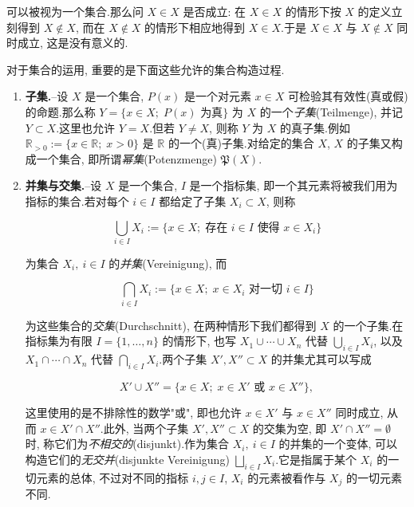 可以被视为一个集合.那么问 $X \in X$ 是否成立: 在 $X \in X$ 的情形下按 $X$ 的定义立刻得到 $X \notin X$, 而在 $X \notin X$ 的情形下相应地得到 $X \in X$.于是 $X \in X$ 与 $X \notin X$ 同时成立, 这是没有意义的.

对于集合的运用, 重要的是下面这些允许的集合构造过程.

\begin{enumerate}
\item[(1)] \textbf{子集.}--设 $X$ 是一个集合, $P(x)$ 是一个对元素 $x \in X$ 可检验其有效性(真或假)的命题.那么称 $Y = \{x \in X;\; P(x) \text{ 为真}\}$ 为 $X$ 的一个\emph{子集}(\textup{Teilmenge}), 并记 $Y \subset X$.这里也允许 $Y = X$.但若 $Y \neq X$, 则称 $Y$ 为 $X$ 的真子集.例如 $\mathbb{R}_{>0} := \{x \in \mathbb{R};\; x > 0\}$ 是 $\mathbb{R}$ 的一个(真)子集.对给定的集合 $X$, $X$ 的子集又构成一个集合, 即所谓\emph{幂集}(\textup{Potenzmenge}) $\mathfrak{P}(X)$.

\item[(2)] \textbf{并集与交集.}--设 $X$ 是一个集合, $I$ 是一个指标集, 即一个其元素将被我们用为指标的集合.若对每个 $i \in I$ 都给定了子集 $X_i \subset X$, 则称

\[
\bigcup_{i \in I} X_i := \{x \in X;\; \text{存在 } i \in I \text{ 使得 } x \in X_i\}
\]

为集合 $X_i,\ i \in I$ 的\emph{并集}(\textup{Vereinigung}), 而

\[
\bigcap_{i \in I} X_i := \{x \in X;\; x \in X_i \text{ 对一切 } i \in I\}
\]

为这些集合的\emph{交集}(\textup{Durchschnitt}), 在两种情形下我们都得到 $X$ 的一个子集.在指标集为有限 $I = \{1, \ldots, n\}$ 的情形下, 也写 $X_1 \cup \cdots \cup X_n$ 代替 $\bigcup_{i \in I} X_i$, 以及 $X_1 \cap \cdots \cap X_n$ 代替 $\bigcap_{i \in I} X_i$.两个子集 $X', X'' \subset X$ 的并集尤其可以写成

\[
X' \cup X'' = \{x \in X;\; x \in X' \text{ 或 } x \in X''\},
\]

这里使用的是不排除性的数学"或", 即也允许 $x \in X'$ 与 $x \in X''$ 同时成立, 从而 $x \in X' \cap X''$.此外, 当两个子集 $X', X'' \subset X$ 的交集为空, 即 $X' \cap X'' = \emptyset$ 时, 称它们为\emph{不相交的}(\textup{disjunkt}).作为集合 $X_i,\ i \in I$ 的并集的一个变体, 可以构造它们的\emph{无交并}(\textup{disjunkte Vereinigung}) $\bigsqcup_{i \in I} X_i$.它是指属于某个 $X_i$ 的一切元素的总体, 不过对不同的指标 $i, j \in I$, $X_i$ 的元素被看作与 $X_j$ 的一切元素不同.


\end{enumerate}
